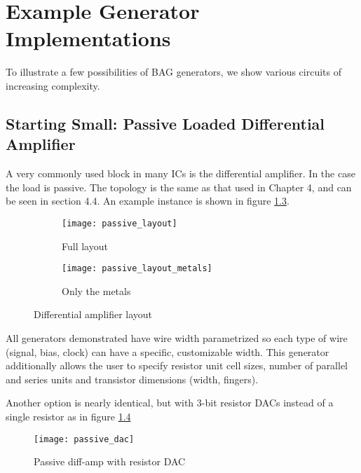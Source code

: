 \chapter{Example Generator Implementations}
To illustrate a few possibilities of BAG generators, we show various circuits of increasing complexity. 
\section{Starting Small: Passive Loaded Differential Amplifier}
A very commonly used block in many ICs is the differential amplifier. In the case the load is passive. The topology is the same as that used in Chapter 4, and can be seen in section 4.4. An example instance is shown in figure \ref{fig:passive_amp}.
\begin{figure}[h]
\centering
\begin{subfigure}{.8\linewidth}
  \centering
  \texttt{[image: passive\_layout]}
  \caption{Full layout}
  \label{fig:sfig1}
\end{subfigure}
\begin{subfigure}{.8\linewidth}
  \centering
\texttt{[image: passive\_layout\_metals]}
  \caption{Only the metals}
  \label{fig:sfig2}
\end{subfigure}
\caption{Differential amplifier layout}
\label{fig:passive_amp}
\end{figure}
All generators demonstrated have wire width parametrized so each type of wire (signal, bias, clock) can have a specific, customizable width. This generator additionally allows the user to specify resistor unit cell sizes, number of parallel and series units and transistor dimensions (width, fingers).

Another option is nearly identical, but with 3-bit resistor DACs instead of a single resistor as in figure \ref{fig:passive_dac}
\begin{figure}[h]
\centering
\texttt{[image: passive\_dac]}
\caption{Passive diff-amp with resistor DAC}
\label{fig:passive_dac}
\end{figure}

